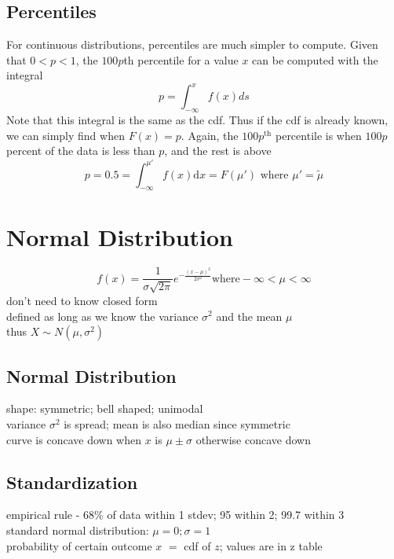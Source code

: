 \subsection{Percentiles}  %
For continuous distributions, percentiles are much simpler to compute. Given that $0<p<1$, the $100p$th percentile for a value $x$ can be computed with the integral
\begin{equation}
    p=\int_{-\infty}^{x} f(x)ds
\end{equation}
Note that this integral is the same as the cdf. Thus if the cdf is already known, we can simply find when $F(x)=p$. Again, the $100p^{\text{th}}$ percentile is when $100p$ percent of the data is less than $p$, and the rest is above\\
\begin{equation}
    p=0.5=\int_{-\infty}^{\mu'} f(x)\mathrm{d}x=F(\mu')\text{ where } \mu'=\tilde{\mu}
\end{equation}

\section{Normal Distribution}  %
\begin{equation}
    f(x)=\frac{1}{\sigma \sqrt{2\pi}}e^{-\frac{(x-\mu)^2}{2\sigma^2}} \mathrm{ where } -\infty<\mu<\infty
\end{equation}
don't need to know closed form \\
defined as long as we know the variance $\sigma^2$ and the mean $\mu$ \\
thus $X\sim N(\mu, \sigma^2)$
\subsection{Normal Distribution}  %
shape: symmetric; bell shaped; unimodal \\
variance $\sigma^2$ is spread; mean is also median since symmetric \\
curve is concave down when $x$ is $\mu\pm\sigma$ otherwise concave down

\subsection{Standardization}  %
empirical rule - 68\% of data within 1 stdev; 95 within 2; 99.7 within 3 \\
standard normal distribution: $\mu=0; \sigma=1$\\
probability of certain outcome $x$ $=$ cdf of $z$; values are in z table \\

